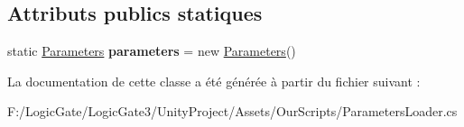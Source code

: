 \subsection*{Attributs publics statiques}
\begin{DoxyCompactItemize}
\item 
\mbox{\label{class_parameters_loader_abebe48dd7b94d1efd572378cc299a743}} 
static \mbox{\hyperlink{class_parameters}{Parameters}} {\bfseries parameters} = new \mbox{\hyperlink{class_parameters}{Parameters}}()
\end{DoxyCompactItemize}


La documentation de cette classe a été générée à partir du fichier suivant \+:\begin{DoxyCompactItemize}
\item 
F\+:/\+Logic\+Gate/\+Logic\+Gate3/\+Unity\+Project/\+Assets/\+Our\+Scripts/Parameters\+Loader.\+cs\end{DoxyCompactItemize}
